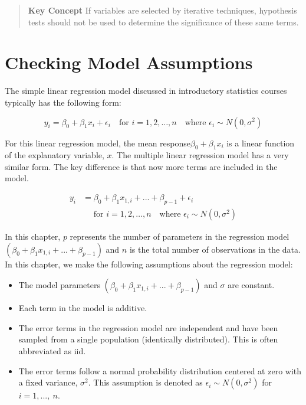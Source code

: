 \documentclass[
]{report}
\providecommand{\tightlist}{%
  \setlength{\itemsep}{0pt}\setlength{\parskip}{0pt}}
\begin{document}
\begin{quote}
\textbf{Key Concept}
If variables are selected by iterative techniques, hypothesis tests should not be used to determine the significance of these same terms.
\end{quote}

\hypertarget{checking-model-assumptions-1}{%
\section{\texorpdfstring{\textbf{Checking Model Assumptions}}{Checking Model Assumptions}}\label{checking-model-assumptions-1}}

The simple linear regression model discussed in introductory statistics courses typically has the following form:

\begin{equation}\label{slr}
y_i = \beta_0 + \beta_1 x_i + \epsilon_i \quad \text{for } i = 1, 2, \dots, n \quad \text{where } \epsilon_i \sim N(0, \sigma^2)
\tag{3.5}
\end{equation}

For this linear regression model, the mean response\(\beta_0 + \beta_1x_i\) is a linear function of the explanatory variable, \(x\). The multiple linear regression model has a very similar form. The key difference is that now more terms are included in the model.

\begin{align}\label{mlr}
y_i &= \beta_0 + \beta_1x_{1,i} + {...} + \beta_{p-1}  + \epsilon_i  \\
    &\quad  \text{   for } i = 1, 2, \dots, n \quad \text{where } \epsilon_i \sim N(0, \sigma^2)
\tag{3.6}
\end{align}

In this chapter, \(p\) represents the number of parameters in the regression model \((\beta_0 + \beta_1x_{1,i} + {...} + \beta_{p-1})\) and \(n\) is the total number of observations in the data. In this chapter, we make the following assumptions about the regression model:

\begin{itemize}
\tightlist
\item
  The model parameters \((\beta_0 + \beta_1x_{1,i} + {...} + \beta_{p-1})\) and \(\sigma\) are constant.
\item
  Each term in the model is additive.
\item
  The error terms in the regression model are independent and have been sampled from a single population (identically distributed). This is often abbreviated as iid.
\item
  The error terms follow a normal probability distribution centered at zero with a fixed variance, \(\sigma^2\). This assumption is denoted as \(\epsilon_i \sim N(0,\sigma^2)\) for \(i = 1, {...}, ~ n\).
\end{itemize}
\end{document}
